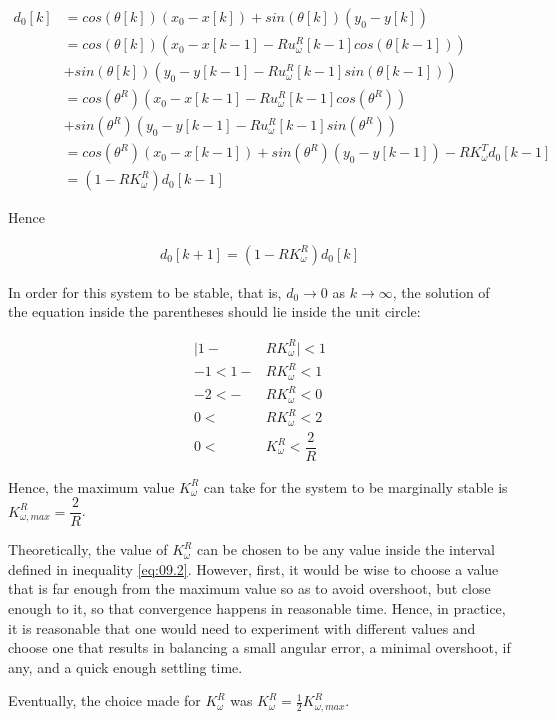 \begin{align*}
  d_0[k] &= cos(\theta[k]) (x_0 - x[k]) + sin(\theta[k]) (y_0 - y[k]) \\
         &= cos(\theta[k]) (x_0 - x[k-1] - R u_{\omega}^R[k-1] cos(\theta[k-1])) \\
         &+ sin(\theta[k]) (y_0 - y[k-1] - R u_{\omega}^R[k-1] sin(\theta[k-1])) \\
         &= cos(\theta^R) (x_0 - x[k-1] - R u_{\omega}^R[k-1] cos(\theta^R)) \\
         &+ sin(\theta^R) (y_0 - y[k-1] - R u_{\omega}^R[k-1] sin(\theta^R)) \\
         &= cos(\theta^R) (x_0 - x[k-1]) + sin(\theta^R) (y_0 - y[k-1]) -R K_{\omega}^T d_0[k-1]  \\
         &= (1-R K_{\omega}^R)d_0[k-1]
\end{align*}

Hence

\begin{align*}
  d_0[k+1]= (1-R K_{\omega}^R)d_0[k]
\end{align*}

In order for this system to be stable, that is, $d_0 \to 0$ as $k \to \infty$,
the solution of the equation inside the parentheses should lie inside the unit
circle:

\begin{align}
  \Big|1 - &R K_{\omega}^R\Big| < 1 \nonumber \\
  -1 < 1 - &R K_{\omega}^R < 1 \nonumber \\
  -2 < - &R K_{\omega}^R < 0 \nonumber \\
   0 <\ &R K_{\omega}^R < 2 \nonumber \\
   0 <\ &K_{\omega}^R < \dfrac{2}{R} \label{eq:09.2}
\end{align}

Hence, the maximum value $K_{\omega}^R$ can take for the system to be marginally
stable is $K_{\omega,max}^R = \dfrac{2}{R}$.

Theoretically, the value of $K_{\omega}^R$ can be chosen to be any value inside
the interval defined in inequality \ref{eq:09.2}. However, first, it would be
wise to choose a value that is far enough from the maximum value so as to avoid
overshoot, but close enough to it, so that convergence happens in reasonable
time. Hence, in practice, it is reasonable that one would need to experiment
with different values and choose one that results in balancing a small angular
error, a minimal overshoot, if any, and a quick enough settling time.

Eventually, the choice made for $K_{\omega}^R$ was
$K_{\omega}^R = \frac{1}{2} K_{\omega,max}^R$.
